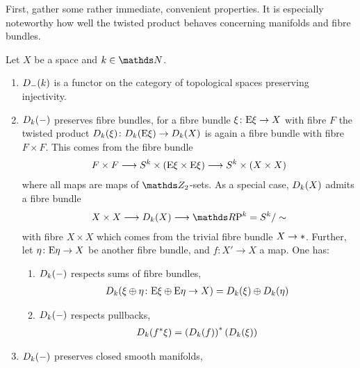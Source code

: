First, gather some rather immediate, convenient properties. It is
especially noteworthy how well the twisted product behaves concerning
manifolds and fibre bundles.
\begin{Rem}\label{rem:twistedprodproperties}
  Let $X$ be a space and $k\in\Nat$.
  \begin{enumerate}
  \item $D_{-}({k})$ is a functor on the category of
    topological spaces preserving injectivity.
  \item\label{item:twistedprodfibrebdl}
    $D_{k}({-})$ preserves fibre bundles,
    \idest for a fibre bundle $\xi\colon\mathrm{E}\xi\to X$ with fibre $F$
    the twisted product $D_{k}({\xi})\colon
    D_{k}({\mathrm{E}\xi})\to D_{k}({X})$
    is again a fibre bundle with fibre $F\times F$.
    This comes from the fibre bundle
    \begin{gather*}
      F\times F
      \longrightarrow S^{k}\times(\mathrm{E}\xi\times \mathrm{E}\xi)
      \longrightarrow S^{k}\times(X\times X)
    \end{gather*}
    where all maps are maps of $\Zmod2$-sets.
    As a special case, $D_{k}({X})$ admits a fibre bundle
    \begin{gather}\label{eq:twistedprodrpnfibrebdl}
      X\times X
      \longto \Twistedprod{k}{X}
      \longto \RP k = \Sphere k/\sim
    \end{gather}
    with fibre $X\times X$ which comes from the trivial fibre bundle
    $X\to*$.
    Further, let $\eta\colon\mathrm{E}\eta\to X$ be
    another fibre bundle, and $f\colon X'\to X$ a map.
    One has:
    \begin{enumerate}
    \item $D_{k}({-})$ respects sums of fibre bundles, \idest
      \begin{gather*}
        D_{k}({\xi\oplus\eta\colon \mathrm{E}\xi\oplus\mathrm{E}\eta\to X})
        = D_{k}({\xi})\oplus D_{k}({\eta})
      \end{gather*}
    \item\label{item:twistedprod:preservespb}
      $D_{k}({-})$ respects pullbacks, \idest
      \begin{gather*}
        D_{k}({{f}^* \xi})
        = {\left(D_{k}({f})\right)}^*
        \left(D_{k}({\xi})\right)
      \end{gather*}
    \end{enumerate}
  \item\label{item:twistedprodmanifold}
    $D_{k}({-})$ preserves closed smooth manifolds, \idest

\end{enumerate}
\end{Rem}
